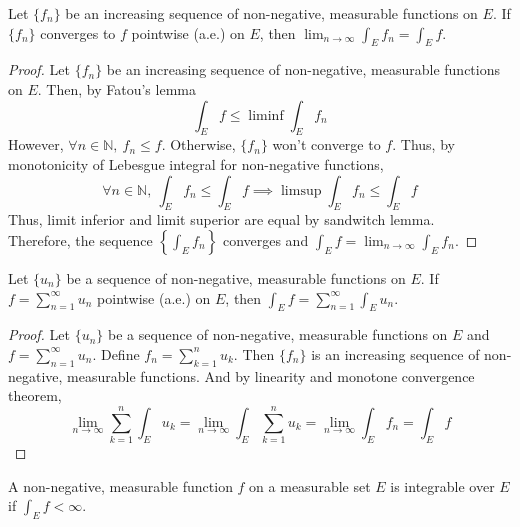 \begin{theorem}
	Let $\{ f_n \}$ be an increasing sequence of non-negative, measurable functions on $E$.
	If $\{ f_n \}$ converges to $f$ pointwise (a.e.) on $E$, then $\displaystyle \lim_{n \to \infty} \int_E f_n = \int_E f$.
\end{theorem}
\begin{proof}
	Let $\{ f_n \}$ be an increasing sequence of non-negative, measurable functions on $E$.
	Then, by Fatou's lemma
	\begin{equation}
		\int_E f \le \liminf \int_E f_n
	\end{equation}
	However, $\forall n \in \mathbb{N},\ f_n \le f$.
	Otherwise, $\{ f_n \}$ won't converge to $f$.
	Thus, by monotonicity of Lebesgue integral for non-negative functions,
	\begin{equation}
		\forall n \in \mathbb{N},\ \int_E f_n \le \int_E f \implies \limsup \int_E f_n \le \int_E f
	\end{equation}
	Thus, limit inferior and limit superior are equal by sandwitch lemma.\\
	Therefore, the sequence $\displaystyle \left\{ \int_E f_n \right\}$ converges and $\displaystyle \int_E f = \lim_{n \to \infty} \int_E f_n$.
\end{proof}
\begin{corollary}
	Let $\{ u_n \}$ be a sequence of non-negative, measurable functions on $E$.
	If $\displaystyle f = \sum_{n =1}^\infty u_n$ pointwise (a.e.) on $E$, then $\displaystyle \int_E f = \sum_{n = 1}^\infty \int_E u_n$.
\end{corollary}
\begin{proof}
	Let $\{ u_n \}$ be a sequence of non-negative, measurable functions on $E$ and $f = \sum_{n = 1}^\infty u_n$.
	Define $f_n =\sum_{k = 1}^n u_k$.
	Then $\{ f_n \}$ is an increasing sequence of non-negative, measurable functions.
	And by linearity and monotone convergence theorem,
	$$\lim_{n \to \infty} \sum_{k = 1}^n \int_E u_k = \lim_{n \to \infty} \int_E \sum_{k = 1}^n u_k = \lim_{n \to \infty} \int_E f_n = \int_E f$$
\end{proof}

\begin{definition}
	A non-negative, measurable function $f$ on a measurable set $E$ is integrable over $E$ if $\displaystyle \int_E f < \infty$.
\end{definition}


